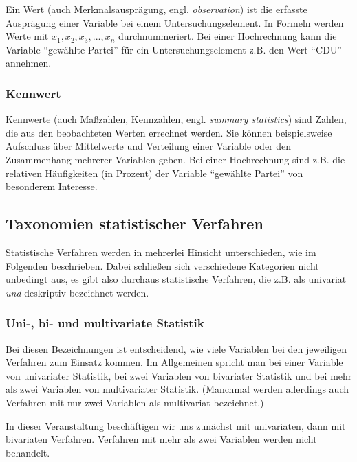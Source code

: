 \documentclass[
  11pt,
  ngerman,
  a4paper,
]{report}
\begin{document}
Ein Wert (auch Merkmalsausprägung, engl. \emph{observation}) ist die erfasste Ausprägung einer Variable bei einem Untersuchungselement. In Formeln werden Werte mit \(x_1, x_2, x_3, ..., x_n\) durchnummeriert. Bei einer Hochrechnung kann die Variable \enquote{gewählte Partei} für ein Untersuchungselement z.B. den Wert \enquote{CDU} annehmen.

\hypertarget{kennwert}{%
\subsubsection{Kennwert}\label{kennwert}}

Kennwerte (auch Maßzahlen, Kennzahlen, engl. \emph{summary statistics}) sind Zahlen, die aus den beobachteten Werten errechnet werden. Sie können beispielsweise Aufschluss über Mittelwerte und Verteilung einer Variable oder den Zusammenhang mehrerer Variablen geben. Bei einer Hochrechnung sind z.B. die relativen Häufigkeiten (in Prozent) der Variable \enquote{gewählte Partei} von besonderem Interesse.

\hypertarget{taxonomien-statistischer-verfahren}{%
\subsection{Taxonomien statistischer Verfahren}\label{taxonomien-statistischer-verfahren}}

Statistische Verfahren werden in mehrerlei Hinsicht unterschieden, wie im Folgenden beschrieben. Dabei schließen sich verschiedene Kategorien nicht unbedingt aus, es gibt also durchaus statistische Verfahren, die z.B. als univariat \emph{und} deskriptiv bezeichnet werden.

\hypertarget{uni--bi--und-multivariate-statistik}{%
\subsubsection{Uni-, bi- und multivariate Statistik}\label{uni--bi--und-multivariate-statistik}}

Bei diesen Bezeichnungen ist entscheidend, wie viele Variablen bei den jeweiligen Verfahren zum Einsatz kommen. Im Allgemeinen spricht man bei einer Variable von univariater Statistik, bei zwei Variablen von bivariater Statistik und bei mehr als zwei Variablen von multivariater Statistik. (Manchmal werden allerdings auch Verfahren mit nur zwei Variablen als multivariat bezeichnet.)

In dieser Veranstaltung beschäftigen wir uns zunächst mit univariaten, dann mit bivariaten Verfahren. Verfahren mit mehr als zwei Variablen werden nicht behandelt.
\end{document}
